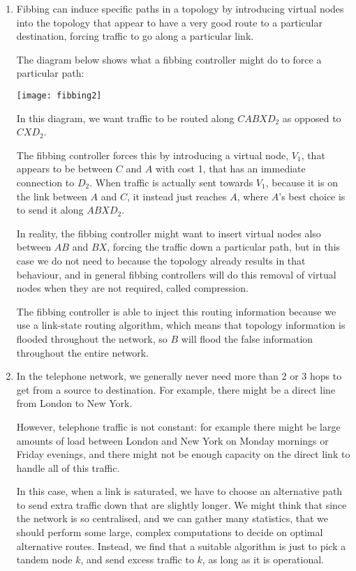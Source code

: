 


\begin{enumerate}[label=(\alph*)]
  \item
    Fibbing can induce specific paths in a topology by introducing virtual nodes into the topology that appear to have a very good route to a particular destination, forcing traffic to go along a particular link.

    The diagram below shows what a fibbing controller might do to force a particular path:

    \texttt{[image: fibbing2]}

    In this diagram, we want traffic to be routed along $CABXD_2$ as opposed to $CXD_2$.

    The fibbing controller forces this by introducing a virtual node, $V_1$, that appears to be between $C$ and  $A$ with cost 1, that has an immediate connection to $D_2$. When traffic is actually sent towards $V_1$, because it is on the link between $A$ and $C$, it instead just reaches $A$, where $A$'s best choice is to send it along $ABXD_2$.

    In reality, the fibbing controller might want to insert virtual nodes also between $AB$ and $BX$, forcing the traffic down a particular path, but in this case we do not need to because the topology already results in that behaviour, and in general fibbing controllers will do this removal of virtual nodes when they are not required, called compression.

    The fibbing controller is able to inject this routing information because we use a link-state routing algorithm, which means that topology information is flooded throughout the network, so $B$ will flood the false information throughout the entire network.

  \item
    In the telephone network, we generally never need more than 2 or 3 hops to get from a source to destination. For example, there might be a direct line from London to New York.

    However, telephone traffic is not constant: for example there might be large amounts of load between London and New York on Monday mornings or Friday evenings, and there might not be enough capacity on the direct link to handle all of this traffic.

    In this case, when a link is saturated, we have to choose an alternative path to send extra traffic down that are slightly longer. We might think that since the network is so centralised, and we can gather many statistics, that we should perform some large, complex computations to decide on optimal alternative routes. Instead, we find that a suitable algorithm is just to pick a tandem node $k$, and send excess traffic to $k$, as long as it is operational.


\end{enumerate}
